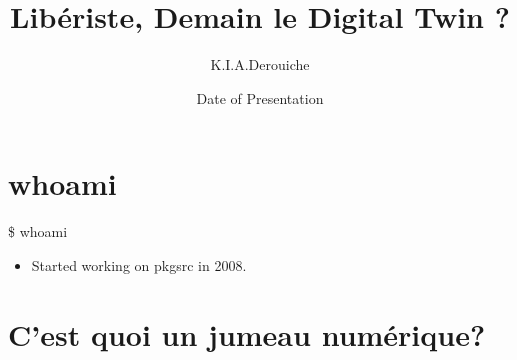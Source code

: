 \documentclass{beamer}
\title[Your Short Title]{Libériste, Demain le Digital Twin ?}
\author{K.I.A.Derouiche}
\institute{Where You're From}
\date{Date of Presentation}
\begin{document}
\begin{frame}
  \titlepage
\end{frame}


\section{whoami}

\begin{frame}{\$ whoami}
  \begin{itemize}
     \item Started working on pkgsrc in 2008.
  \end{itemize}
\end{frame}
\section{C'est quoi un jumeau numérique?}
\end{document}
